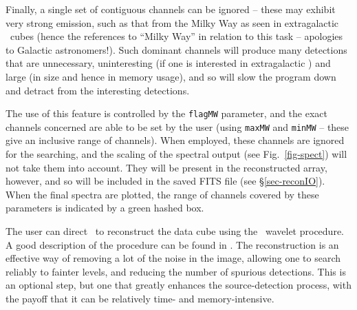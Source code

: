 
Finally, a single set of contiguous channels can be ignored -- these
may exhibit very strong emission, such as that from the Milky Way as
seen in extragalactic \hi\ cubes (hence the references to ``Milky
Way'' in relation to this task -- apologies to Galactic
astronomers!). Such dominant channels will produce many detections
that are unnecessary, uninteresting (if one is interested in
extragalactic \hi) and large (in size and hence in memory usage), and
so will slow the program down and detract from the interesting
detections. 

The use of this feature is controlled by the \texttt{flagMW}
parameter, and the exact channels concerned are able to be set by the
user (using \texttt{maxMW} and \texttt{minMW} -- these give an
inclusive range of channels). When employed, these channels are
ignored for the searching, and the scaling of the spectral output (see
Fig.~\ref{fig-spect}) will not take them into account. They will be
present in the reconstructed array, however, and so will be included
in the saved FITS file (see \S\ref{sec-reconIO}). When the final
spectra are plotted, the range of channels covered by these parameters
is indicated by a green hashed box.

\label{sec-recon}

The user can direct \duchamp\ to reconstruct the data cube using the
\atrous\ wavelet procedure. A good description of the procedure can be
found in \citet{starck02:book}. The reconstruction is an effective way
of removing a lot of the noise in the image, allowing one to search
reliably to fainter levels, and reducing the number of spurious
detections. This is an optional step, but one that greatly enhances
the source-detection process, with the payoff that it can be
relatively time- and memory-intensive.


